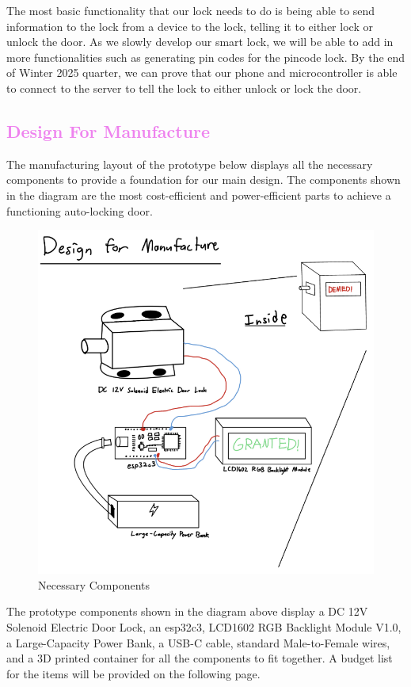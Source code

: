 The most basic functionality that our lock needs to do is being able to send information to the lock from a device to the lock, telling it to either lock or unlock the door. As we slowly develop our smart lock, we will be able to add in more functionalities such as generating pin codes for the pincode lock. By the end of Winter 2025 quarter, we can prove that our phone and microcontroller is able to connect to the server to tell the lock to either unlock or lock the door.

\newpage
\textcolor{violet}{\subsection{Design For Manufacture} \label{DesignForManufacture}}

The manufacturing layout of the prototype below displays all the necessary components to provide a foundation for our main design. The components shown in the diagram are the most cost-efficient and power-efficient parts to achieve a functioning auto-locking door.

\begin{figure}[!ht]
    \centering
    \includegraphics[width=0.85\linewidth]{./img/DFM.png}
    \caption{Necessary Components}
    \label{fig:enter-label}
\end{figure}

The prototype components shown in the diagram above display a DC 12V Solenoid Electric Door Lock, an esp32c3, LCD1602 RGB Backlight Module V1.0, a Large-Capacity Power Bank, a USB-C cable, standard Male-to-Female wires, and a 3D printed container for all the components to fit together. A budget list for the items will be provided on the following page.

\newpage

